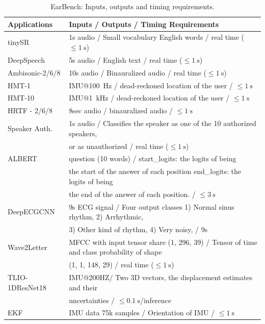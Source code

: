 \begin{table}[]
\label{tab:earbench}
\caption{EarBench: Inputs, outputs and timing requirements.}
\tiny
\begin{tabular}{ll}
\toprule
Applications    & Inputs / Outputs / Timing Requirements  \\ \midrule
tinySR          & 1s audio /
Small vocabulary English words
/ real time ($\leq \SI{1}{\second}$)   \\
DeepSpeech      & 5s audio /
English text
/ real time ($\leq \SI{1}{\second}$)   \\
Ambisonic-2/6/8     & 10s audio /
Binauralized audio
/ real time ($\leq \SI{1}{\second}$)   \\
HMT-1           & IMU@\SI{100}{\hertz} /
dead-reckoned location of the user
/  $\leq \SI{1}{\second}$             \\
HMT-10          & IMU@\SI{1}{\kilo\hertz} /
dead-reckoned location of the user
/ $\leq \SI{1}{\second}$               \\
HRTF - 2/6/8    &  8sec audio / binauralized audio /   $\leq \SI{1}{\second}$ \\
Speaker Auth.   & 1s audio /
Classifies the speaker as one of the 10 authorized speakers,\\
& or as unauthorized
/ real time ($\leq \SI{1}{\second}$)    \\
ALBERT          & question (10 words) /
start\_logits: the logits of being \\
& the start of the answer of each position
end\_logits: the logits of being \\
& the end of the answer of each position.
/  $\leq \SI{3}{\second}$\\
DeepECGCNN      & 9s ECG signal  /
Four output classes 1) Normal sinus rhythm, 2) Arrhythmic, \\
& 3) Other kind
of rhythm,
4) Very noisy,
/ 9s                    \\
Wave2Letter     &  MFCC with input tensor share (1, 296, 39)
/ Tensor of time and class probability of shape \\
& (1, 1, 148, 29)
/ real time ($\leq \SI{1}{\second}$)  \\
TLIO-1DResNet18 & IMU@200HZ/
Two 3D vectors, the displacement estimates and their \\
& uncertainties
/ $\leq \SI{0.1}{\second}$/inference \\
EKF & IMU data 75k samples / Orientation of IMU /  $\leq \SI{1}{\second}$\\
\bottomrule
\end{tabular}
\label{tab:requirements}
\end{table}

